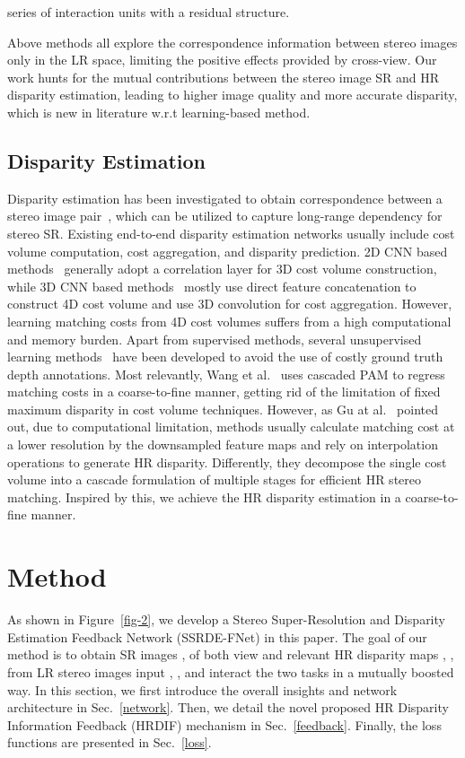 \documentclass[sigconf]{acmart}
\begin{document}
series of interaction units with a residual structure.

Above methods all explore the correspondence information between stereo images only in the LR space, limiting the positive effects provided by cross-view. Our work hunts for the mutual contributions between the stereo image SR and HR disparity estimation, leading to higher image quality and more accurate disparity, which is new in literature w.r.t learning-based method.

\subsection{Disparity Estimation}
Disparity estimation has been investigated to obtain correspondence between a stereo image pair~\cite{Scharstein2004ATA, Luo2016EfficientDL}, which can be utilized to capture long-range dependency for stereo SR. Existing end-to-end disparity estimation networks usually include cost volume computation, cost aggregation, and disparity prediction. 2D CNN based methods~\cite{Mayer2016ALD, Liang2018LearningFD, Xu2020AANetAA} generally adopt a correlation layer for 3D cost volume construction, while 3D CNN based methods~\cite{Kendall2017EndtoEndLO, Chang2018PyramidSM, Nie2019MultiLevelCU, Zhang2019GANetGA, Chabra2019StereoDRNetDR} mostly use direct feature concatenation to construct 4D cost volume and use 3D convolution for cost aggregation. However, learning matching costs from 4D cost volumes suffers from a high computational and memory burden. Apart from supervised methods, several unsupervised learning methods~\cite{Zhou2017UnsupervisedLO, Li2018OcclusionAS, Yang2018SegStereoES, Pilzer2020ProgressiveFF, Wang2020ParallaxAF} have been developed to avoid the use of costly ground truth depth annotations. Most relevantly, Wang et al.~\cite{Wang2020ParallaxAF} uses cascaded PAM to regress matching costs in a coarse-to-fine manner, getting rid of the limitation of fixed maximum disparity in cost volume techniques. However, as Gu at al.~\cite{Gu2020CascadeCV} pointed out, due to computational limitation, methods usually calculate matching cost at a lower resolution by the downsampled feature maps and rely on interpolation operations to generate HR disparity. Differently, they decompose the single cost volume into a cascade formulation of multiple stages for efficient HR stereo matching. Inspired by this, we achieve the HR disparity estimation in a coarse-to-fine manner.


\section{Method}
As shown in Figure~\ref{fig-2}, we develop a Stereo Super-Resolution and Disparity Estimation Feedback Network (SSRDE-FNet) in this paper. The goal of our method is to obtain SR images ,  of both view and relevant HR disparity maps , , from LR stereo images input , , and interact the two tasks in a mutually boosted way. In this section, we first introduce the overall insights and network architecture in Sec.~\ref{network}. Then, we detail the novel proposed HR Disparity Information Feedback (HRDIF) mechanism in Sec.~\ref{feedback}. Finally, the loss functions are presented in Sec.~\ref{loss}.
\end{document}
